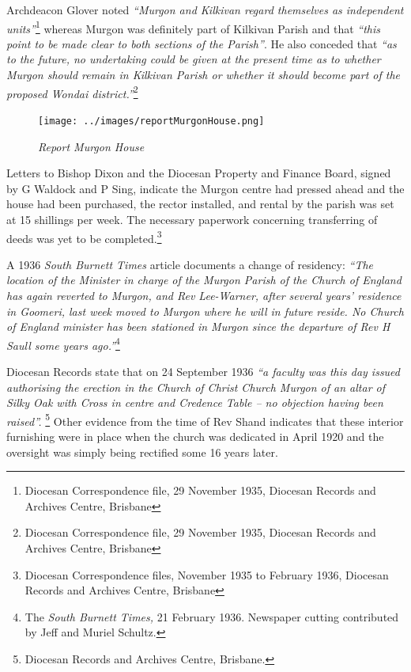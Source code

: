Archdeacon Glover noted \emph{``Murgon and Kilkivan regard themselves as independent units''}\footnote{Diocesan Correspondence file, 29 November 1935, Diocesan Records and Archives Centre, Brisbane} whereas Murgon was definitely part of Kilkivan Parish and that \emph{``this point to be made clear to both sections of the Parish''}. He also conceded that \emph{``as to the future, no undertaking could be given at the present time as to whether Murgon should remain in Kilkivan Parish or whether it should become part of the proposed Wondai district.''}\footnote{Diocesan Correspondence file, 29 November 1935, Diocesan Records and Archives Centre, Brisbane}








\begin{figure}[!htb]
\begin{center}
\texttt{[image: ../images/reportMurgonHouse.png]}
\caption{\itshape Report Murgon House}
\end{center}
\end{figure}




Letters to Bishop Dixon and the Diocesan Property and Finance Board, signed by G Waldock and P Sing, indicate the Murgon centre had pressed ahead and the house had been purchased, the rector installed, and rental by the parish was set at 15 shillings per week. The necessary paperwork concerning transferring of deeds was yet to be completed.\footnote{Diocesan Correspondence files, November 1935 to February 1936, Diocesan Records and Archives Centre, Brisbane}


A 1936 \emph{South Burnett Times} article documents a change of residency: \emph{``The location of the Minister in charge of the Murgon Parish of the Church of England has again reverted to Murgon, and Rev Lee-Warner, after several years' residence in Goomeri, last week moved to Murgon where he will in future reside. No Church of England minister has been stationed in Murgon since the departure of Rev H Saull some years ago.''}\footnote{The \emph{South Burnett Times,} 21 February 1936. Newspaper cutting contributed by Jeff and Muriel Schultz.}


\smallskip


Diocesan Records state that on 24 September 1936 \emph{``a faculty was this day issued authorising the erection in the Church of Christ Church Murgon of an altar of Silky Oak with Cross in centre and Credence Table -- no objection having been raised''.} \footnote{Diocesan Records and Archives Centre, Brisbane.} Other evidence from the time of Rev Shand indicates that these interior furnishing were in place when the church was dedicated in April 1920 and the oversight was simply being rectified some 16 years later.


